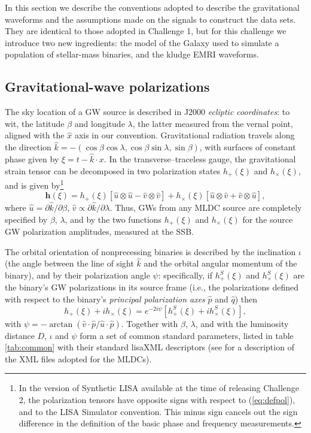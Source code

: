 \documentclass{iopart}
\begin{document}
In this section we describe the conventions adopted to describe the gravitational waveforms and the assumptions made on the signals to construct the data sets. They are identical to those adopted in Challenge 1, but for this challenge we introduce two new ingredients: the model of the Galaxy used to simulate a population of stellar-mass binaries, and the kludge EMRI waveforms.

\subsection{Gravitational-wave polarizations}
\label{ss:polarizations}

The sky location of a GW source is described in J2000 \emph{ecliptic coordinates}: to wit, the latitude $\beta$ and longitude $\lambda$, the latter measured from the vernal point, aligned with the $\hat{x}$ axis in our convention. Gravitational radiation travels along the direction $\hat{k} = -(\cos \beta \cos \lambda, \cos \beta \sin \lambda, \sin \beta)$, with surfaces of constant phase given by $\xi = t - \hat{k} \cdot x$. In the transverse--traceless gauge, the gravitational strain tensor can be decomposed in two polarization states $h_{+}(\xi)$ and $h_{\times}(\xi)$, and is given by\footnote{In the version of Synthetic LISA available at the time of releasing Challenge 2, the polarization tensors have opposite signs with respect to (\ref{eq:defpol}), and to the LISA Simulator convention. This minus sign cancels out the sign difference in the definition of the basic phase and frequency measurements.} 
%
\begin{equation}
\label{eq:defpol}
\mathbf{h}(\xi) = h_{+}(\xi) \left[ \hat{u}\otimes \hat{u} - \hat{v}\otimes \hat{v} \right] + h_{\times}(\xi) \left[ \hat{u}\otimes \hat{v} + \hat{v}\otimes \hat{u} \right],
\end{equation}
%
where $\hat{u} = \partial \hat{k} / \partial{\beta}$, $\hat{v} \propto \partial \hat{k} / \partial{\lambda}$. Thus, GWs from any MLDC source are completely specified by $\beta$, $\lambda$, and by the two functions $h_+(\xi)$ and $h_\times(\xi)$ for the source GW polarization amplitudes, measured at the SSB.

The orbital orientation of nonprecessing binaries is described by the inclination $\iota$ (the angle between the line of sight $\hat{k}$ and the orbital angular momentum of the binary), and by their polarization angle $\psi$: specifically, if $h^S_{+}(\xi)$ and $h^S_\times(\xi)$ are the binary's GW polarizations in its source frame (i.e., the polarizations defined with respect to the binary's \emph{principal polarization axes} $\hat{p}$ and $\hat{q}$) then 
%
\begin{equation}
\label{eq:polrot}
h_+(\xi) + i h_\times(\xi) = e^{-2 i \psi} \left[ h^S_+(\xi) + i h^S_\times(\xi) \right],
\end{equation}
%
with $\psi = -\arctan(\hat{v} \cdot \hat{p} / \hat{u} \cdot \hat{p})$.
Together with $\beta$, $\lambda$, and with the luminosity distance $D$, $\iota$ and $\psi$ form a set of common standard parameters, listed in table \ref{tab:common} with their standard lisaXML descriptors (see \cite{MLDCLISA06b} for a description of the XML files adopted for the MLDCs).
\end{document}
